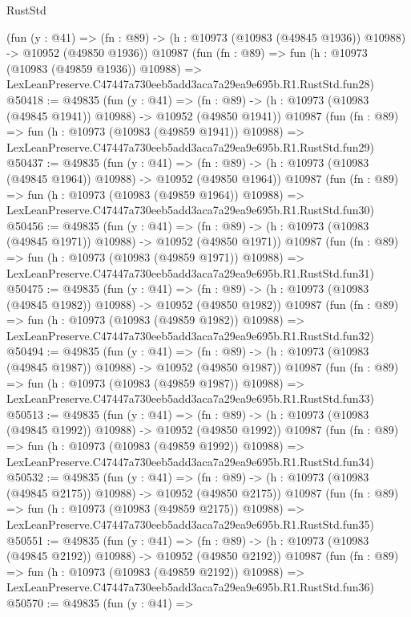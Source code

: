 \begin{lexlean}{RustStd}
\begin{coremodule}
    (fun (y : @41) =>
    (fn : @89) -> (h : @10973 (@10983 (@49845 @1936)) @10988) -> @10952 (@49850 @1936))
    @10987
    (fun (fn : @89) =>
    fun (h : @10973 (@10983 (@49859 @1936)) @10988) =>
    LexLeanPreserve.C47447a730eeb5add3aca7a29ea9e695b.R1.RustStd.fun28)
@50418 := @49835
    (fun (y : @41) =>
    (fn : @89) -> (h : @10973 (@10983 (@49845 @1941)) @10988) -> @10952 (@49850 @1941))
    @10987
    (fun (fn : @89) =>
    fun (h : @10973 (@10983 (@49859 @1941)) @10988) =>
    LexLeanPreserve.C47447a730eeb5add3aca7a29ea9e695b.R1.RustStd.fun29)
@50437 := @49835
    (fun (y : @41) =>
    (fn : @89) -> (h : @10973 (@10983 (@49845 @1964)) @10988) -> @10952 (@49850 @1964))
    @10987
    (fun (fn : @89) =>
    fun (h : @10973 (@10983 (@49859 @1964)) @10988) =>
    LexLeanPreserve.C47447a730eeb5add3aca7a29ea9e695b.R1.RustStd.fun30)
@50456 := @49835
    (fun (y : @41) =>
    (fn : @89) -> (h : @10973 (@10983 (@49845 @1971)) @10988) -> @10952 (@49850 @1971))
    @10987
    (fun (fn : @89) =>
    fun (h : @10973 (@10983 (@49859 @1971)) @10988) =>
    LexLeanPreserve.C47447a730eeb5add3aca7a29ea9e695b.R1.RustStd.fun31)
@50475 := @49835
    (fun (y : @41) =>
    (fn : @89) -> (h : @10973 (@10983 (@49845 @1982)) @10988) -> @10952 (@49850 @1982))
    @10987
    (fun (fn : @89) =>
    fun (h : @10973 (@10983 (@49859 @1982)) @10988) =>
    LexLeanPreserve.C47447a730eeb5add3aca7a29ea9e695b.R1.RustStd.fun32)
@50494 := @49835
    (fun (y : @41) =>
    (fn : @89) -> (h : @10973 (@10983 (@49845 @1987)) @10988) -> @10952 (@49850 @1987))
    @10987
    (fun (fn : @89) =>
    fun (h : @10973 (@10983 (@49859 @1987)) @10988) =>
    LexLeanPreserve.C47447a730eeb5add3aca7a29ea9e695b.R1.RustStd.fun33)
@50513 := @49835
    (fun (y : @41) =>
    (fn : @89) -> (h : @10973 (@10983 (@49845 @1992)) @10988) -> @10952 (@49850 @1992))
    @10987
    (fun (fn : @89) =>
    fun (h : @10973 (@10983 (@49859 @1992)) @10988) =>
    LexLeanPreserve.C47447a730eeb5add3aca7a29ea9e695b.R1.RustStd.fun34)
@50532 := @49835
    (fun (y : @41) =>
    (fn : @89) -> (h : @10973 (@10983 (@49845 @2175)) @10988) -> @10952 (@49850 @2175))
    @10987
    (fun (fn : @89) =>
    fun (h : @10973 (@10983 (@49859 @2175)) @10988) =>
    LexLeanPreserve.C47447a730eeb5add3aca7a29ea9e695b.R1.RustStd.fun35)
@50551 := @49835
    (fun (y : @41) =>
    (fn : @89) -> (h : @10973 (@10983 (@49845 @2192)) @10988) -> @10952 (@49850 @2192))
    @10987
    (fun (fn : @89) =>
    fun (h : @10973 (@10983 (@49859 @2192)) @10988) =>
    LexLeanPreserve.C47447a730eeb5add3aca7a29ea9e695b.R1.RustStd.fun36)
@50570 := @49835
    (fun (y : @41) =>

\end{coremodule}
\end{lexlean}

